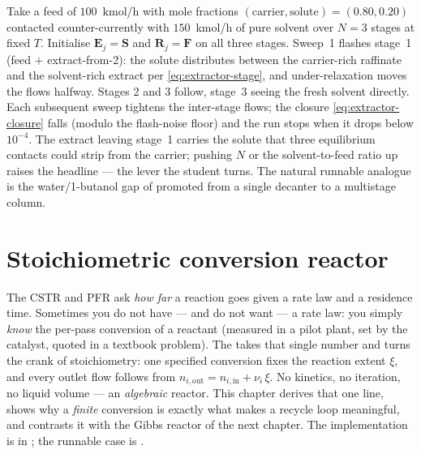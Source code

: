 \documentclass[11pt,a4paper]{article}
\begin{document}
Take a feed of $100$~kmol/h with mole fractions
$(\text{carrier}, \text{solute}) = (0.80, 0.20)$ contacted
counter-currently with $150$~kmol/h of pure solvent over $N=3$ stages at
fixed $T$. Initialise $\mathbf{E}_j = \mathbf{S}$ and
$\mathbf{R}_j = \mathbf{F}$ on all three stages. Sweep~1 flashes stage~1
(feed $+$ extract-from-2): the solute distributes between the
carrier-rich raffinate and the solvent-rich extract per
\eqref{eq:extractor-stage}, and under-relaxation moves the flows halfway.
Stages 2 and 3 follow, stage~3 seeing the fresh solvent directly. Each
subsequent sweep tightens the inter-stage flows; the closure
\eqref{eq:extractor-closure} falls (modulo the flash-noise floor) and the
run stops when it drops below $10^{-4}$. The extract leaving stage~1
carries the solute that three equilibrium contacts could strip from the
carrier; pushing $N$ or the solvent-to-feed ratio up raises the headline
 --- the lever the student turns. The natural
runnable analogue is the water/1-butanol gap of
 promoted from a single decanter to a
multistage column.

\section{Stoichiometric conversion reactor}\label{ch:conversion-reactor}

\begin{whatyoulllearn}
The CSTR and PFR ask \emph{how far} a reaction goes given a rate law and
a residence time. Sometimes you do not have --- and do not want --- a
rate law: you simply \emph{know} the per-pass conversion of a reactant
(measured in a pilot plant, set by the catalyst, quoted in a textbook
problem). The  takes that single number and
turns the crank of stoichiometry: one specified conversion fixes the
reaction extent $\xi$, and every outlet flow follows from
$n_{i,\mathrm{out}} = n_{i,\mathrm{in}} + \nu_i\,\xi$. No kinetics, no
iteration, no liquid volume --- an \emph{algebraic} reactor. This
chapter derives that one line, shows why a \emph{finite} conversion is
exactly what makes a recycle loop meaningful, and contrasts it with the
Gibbs reactor of the next chapter. The implementation is in
; the runnable
case is .
\end{whatyoulllearn}
\end{document}
